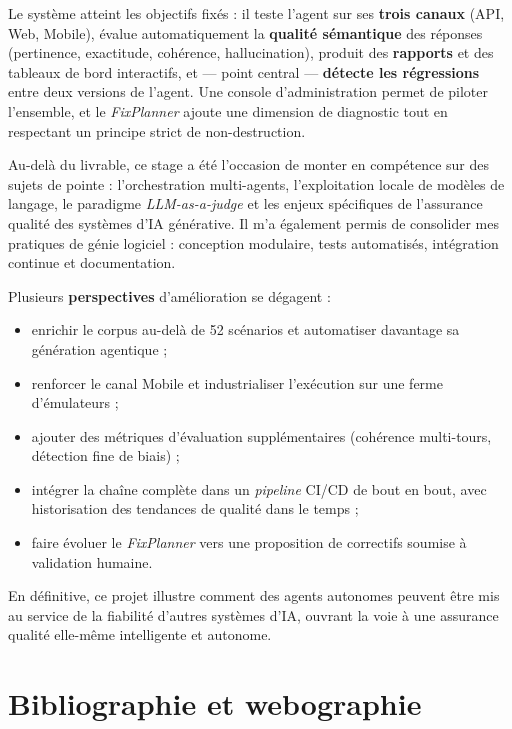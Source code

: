 \documentclass[12pt,a4paper,oneside]{report}
\begin{document}
Le système atteint les objectifs fixés : il teste l'agent sur ses \textbf{trois canaux}
(API, Web, Mobile), évalue automatiquement la \textbf{qualité sémantique} des réponses
(pertinence, exactitude, cohérence, hallucination), produit des \textbf{rapports} et
des tableaux de bord interactifs, et — point central — \textbf{détecte les régressions}
entre deux versions de l'agent. Une console d'administration permet de piloter
l'ensemble, et le \textit{FixPlanner} ajoute une dimension de diagnostic tout en
respectant un principe strict de non-destruction.

Au-delà du livrable, ce stage a été l'occasion de monter en compétence sur des sujets
de pointe : l'orchestration multi-agents, l'exploitation locale de modèles de langage,
le paradigme \textit{LLM-as-a-judge} et les enjeux spécifiques de l'assurance qualité
des systèmes d'IA générative. Il m'a également permis de consolider mes pratiques de
génie logiciel : conception modulaire, tests automatisés, intégration continue et
documentation.

Plusieurs \textbf{perspectives} d'amélioration se dégagent :
\begin{itemize}[leftmargin=*]
  \item enrichir le corpus au-delà de 52 scénarios et automatiser davantage sa
  génération agentique ;
  \item renforcer le canal Mobile et industrialiser l'exécution sur une ferme
  d'émulateurs ;
  \item ajouter des métriques d'évaluation supplémentaires (cohérence multi-tours,
  détection fine de biais) ;
  \item intégrer la chaîne complète dans un \textit{pipeline} CI/CD de bout en bout,
  avec historisation des tendances de qualité dans le temps ;
  \item faire évoluer le \textit{FixPlanner} vers une proposition de correctifs
  soumise à validation humaine.
\end{itemize}

En définitive, ce projet illustre comment des agents autonomes peuvent être mis au
service de la fiabilité d'autres systèmes d'IA, ouvrant la voie à une assurance qualité
elle-même intelligente et autonome.

\chapter*{Bibliographie et webographie}
\end{document}
